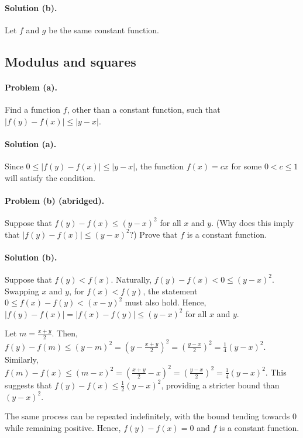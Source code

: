 \documentclass{article}
\begin{document}
\paragraph{Solution (b).} Let $f$ and $g$ be the same constant function.

\setcounter{subsection}{19}
\subsection{Modulus and squares}

\paragraph{Problem (a).} Find a function $f$, other than a constant function, such that $|f(y) - f(x)| \leq |y - x|$.

\paragraph{Solution (a).} Since $0 \leq |f(y) - f(x)| \leq |y - x|$, the function $f(x) = cx$ for some $0 < c \leq 1$ will satisfy the condition.

\paragraph{Problem (b) (abridged).} Suppose that $f(y) - f(x) \leq (y - x)^2$ for all $x$ and $y$. (Why does this imply that $|f(y) - f(x)| \leq (y - x)^2$?) Prove that $f$ is a constant function.

\paragraph{Solution (b).} Suppose that $f(y) < f(x)$. Naturally, $f(y) - f(x) < 0 \leq (y - x)^2$. Swapping $x$ and $y$, for $f(x) < f(y)$, the statement $0 \leq f(x) - f(y) < (x - y)^2$ must also hold. Hence, $|f(y) - f(x)| = |f(x) - f(y)| \leq (y - x)^2$ for all $x$ and $y$.

Let $m = \frac{x + y}{2}$. Then, $f(y) - f(m) \leq (y - m)^2 = \left(y - \frac{x + y}{2}\right)^2 = \left(\frac{y - x}{2}\right)^2 = \frac{1}{4}(y - x)^2$. Similarly, $f(m) - f(x) \leq (m - x)^2 = \left(\frac{x + y}{2} - x\right)^2 = \left(\frac{y - x}{2}\right)^2 = \frac{1}{4}(y - x)^2$. This suggests that $f(y) - f(x) \leq \frac{1}{2}(y - x)^2$, providing a stricter bound than $(y - x)^2$.

The same process can be repeated indefinitely, with the bound tending towards 0 while remaining positive. Hence, $f(y) - f(x) = 0$ and $f$ is a constant function.
\end{document}
